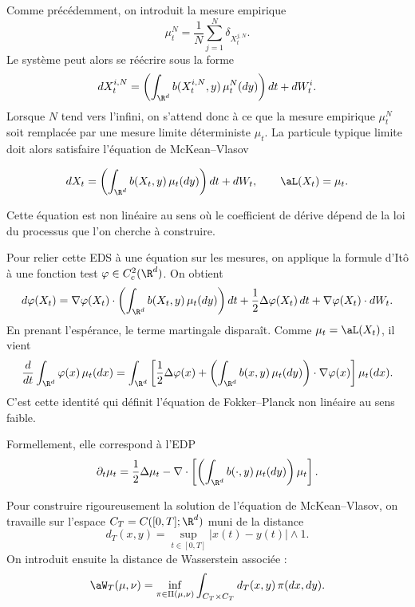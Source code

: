 Comme précédemment, on introduit la mesure empirique
\[
	\mu_t^N
	=
	\frac1N
	\sum_{j=1}^{N}
	\delta_{X_t^{j,N}}.
\]
Le système peut alors se réécrire sous la forme
\[
	dX_t^{i,N}
	=
	\left(
	\int_{\R^d}
	b(X_t^{i,N},y)\,\mu_t^N(dy)
	\right)dt
	+
	dW_t^i.
\]
Lorsque $N$ tend vers l'infini, on s'attend donc à ce que la mesure empirique $\mu_t^N$
soit remplacée par une mesure limite déterministe $\mu_t$. La particule typique limite
doit alors satisfaire l'équation de McKean--Vlasov
\begin{important}
	\begin{equation}
		dX_t
		=
		\left(
		\int_{\R^d}
		b(X_t,y)\,\mu_t(dy)
		\right)dt
		+
		dW_t,
		\qquad
		\aL(X_t)=\mu_t.
		\label{eq:mckean_vlasov_sde}
	\end{equation}
\end{important}
Cette équation est non linéaire au sens où le coefficient de dérive dépend de la loi
du processus que l'on cherche à construire.

Pour relier cette EDS à une équation sur les mesures, on applique la formule d'Itô à une
fonction test $\varphi\in C_c^2(\R^d)$. On obtient
\[
	d\varphi(X_t)
	=
	\nabla\varphi(X_t)\cdot
	\left(
	\int_{\R^d}
	b(X_t,y)\,\mu_t(dy)
	\right)dt
	+
	\frac12\Delta\varphi(X_t)\,dt
	+
	\nabla\varphi(X_t)\cdot dW_t.
\]
En prenant l'espérance, le terme martingale disparaît. Comme $\mu_t=\aL(X_t)$, il vient
\[
	\frac{d}{dt}
	\int_{\R^d}
	\varphi(x)\,\mu_t(dx)
	=
	\int_{\R^d}
	\left[
		\frac12\Delta\varphi(x)
		+
		\left(
		\int_{\R^d}
		b(x,y)\,\mu_t(dy)
		\right)\cdot\nabla\varphi(x)
		\right]
	\mu_t(dx).
\]
C'est cette identité qui définit l'équation de Fokker--Planck non linéaire au sens faible.

\begin{important}
	Formellement, elle correspond à l'EDP
	\begin{equation}
		\partial_t\mu_t
		=
		\frac12\Delta\mu_t
		-
		\nabla\cdot
		\left[
			\left(
			\int_{\R^d}
			b(\cdot,y)\,\mu_t(dy)
			\right)\mu_t
			\right].
		\label{eq:fokker_planck_mckean_vlasov}
	\end{equation}
\end{important}

Pour construire rigoureusement la solution de l'équation de McKean--Vlasov, on travaille
sur l'espace $C_T=C([0,T];\R^d)$ muni de la distance
\[
	d_T(x,y)
	=
	\sup_{t\in[0,T]}|x(t)-y(t)|\wedge 1.
\]
On introduit ensuite la distance de Wasserstein associée :
\[
	\aW_T(\mu,\nu)
	=
	\inf_{\pi\in\Pi(\mu,\nu)}
	\int_{C_T\times C_T}
	d_T(x,y)\,\pi(dx,dy).
\]

